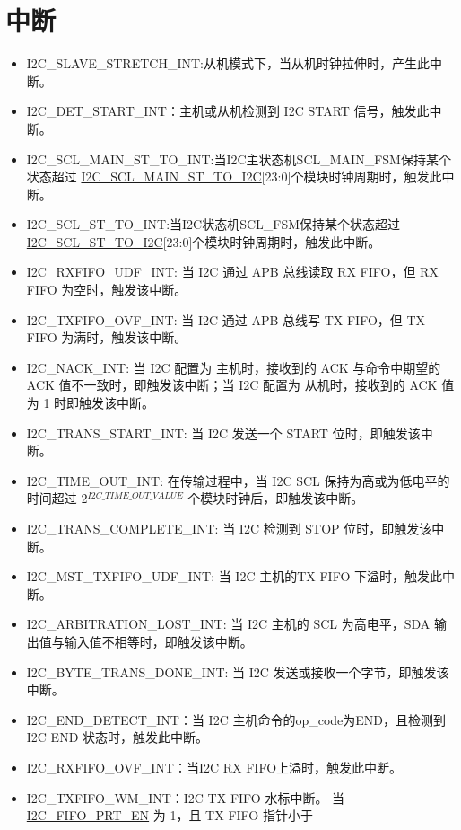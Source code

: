 \documentclass[main\_\_CN.tex]{subfiles}
\begin{document}
\section{中断}\label{sub:i2c-int}
\begin{itemize}
\item \label{int:i2c-slave-stretch}I2C\_SLAVE\_STRETCH\_INT:从机模式下，当从机时钟拉伸时，产生此中断。
\item \label{int:i2c-start}I2C\_DET\_START\_INT：主机或从机检测到 I2C START 信号，触发此中断。
\item \label{int:i2c-scl-main-fsm}I2C\_SCL\_MAIN\_ST\_TO\_INT:当I2C主状态机SCL\_MAIN\_FSM保持某个状态超过 \hyperref[fielddesc:I2CSCLMAINSTTOI2C]{I2C\_SCL\_MAIN\_ST\_TO\_I2C}[23:0]个模块时钟周期时，触发此中断。      
\item \label{int:i2c-scl-fsm}I2C\_SCL\_ST\_TO\_INT:当I2C状态机SCL\_FSM保持某个状态超过 \hyperref[fielddesc:I2CSCLSTTOI2C]{I2C\_SCL\_ST\_TO\_I2C}[23:0]个模块时钟周期时，触发此中断。
\item \label{int:i2c-rxfifo-udf}I2C\_RXFIFO\_UDF\_INT: 当 I2C 通过 APB 总线读取 RX FIFO，但 RX FIFO 为空时，触发该中断。
\item \label{int:i2c-txfifo-ovf}I2C\_TXFIFO\_OVF\_INT: 当 I2C 通过 APB 总线写 TX FIFO，但 TX FIFO 为满时，触发该中断。
\item \label{int:i2c-nack}I2C\_NACK\_INT: 当 I2C 配置为 主机时，接收到的 ACK 与命令中期望的 ACK 值不一致时，即触发该中断；当 I2C 配置为 从机时，接收到的 ACK 值为 1 时即触发该中断。
\item \label{int:i2c-trans-start}I2C\_TRANS\_START\_INT: 当 I2C 发送一个 START 位时，即触发该中断。
\item \label{int:i2c-time-out}I2C\_TIME\_OUT\_INT: 在传输过程中，当 I2C SCL 保持为高或为低电平的时间超过 2$^{\hyperref[fielddesc:I2CTIMEOUTVALUE]{I2C\_TIME\_OUT\_VALUE}}$ 个模块时钟后，即触发该中断。
\item \label{int:i2c-trans-complete}I2C\_TRANS\_COMPLETE\_INT: 当 I2C 检测到 STOP 位时，即触发该中断。
\item \label{int:i2c-mst-txfifo-udf}I2C\_MST\_TXFIFO\_UDF\_INT: 当 I2C 主机的TX FIFO 下溢时，触发此中断。
\item \label{int:i2c-arbitration-lost}I2C\_ARBITRATION\_LOST\_INT: 当 I2C 主机的 SCL 为高电平，SDA 输出值与输入值不相等时，即触发该中断。
\item \label{int:i2c-byte-trans-done}I2C\_BYTE\_TRANS\_DONE\_INT: 当 I2C 发送或接收一个字节，即触发该中断。
\item \label{int:i2c-end}I2C\_END\_DETECT\_INT：当 I2C 主机命令的op\_code为END，且检测到 I2C END 状态时，触发此中断。
\item \label{int:i2c-rxfifo-ovf}I2C\_RXFIFO\_OVF\_INT：当I2C RX FIFO上溢时，触发此中断。
\item \label{int:i2c-txfifo-wm}I2C\_TXFIFO\_WM\_INT：I2C TX FIFO 水标中断。 当\hyperref[fielddesc:I2CFIFOPRTEN]{I2C\_FIFO\_PRT\_EN} 为 1，且 TX FIFO 指针小于


\end{itemize}
\end{document}

